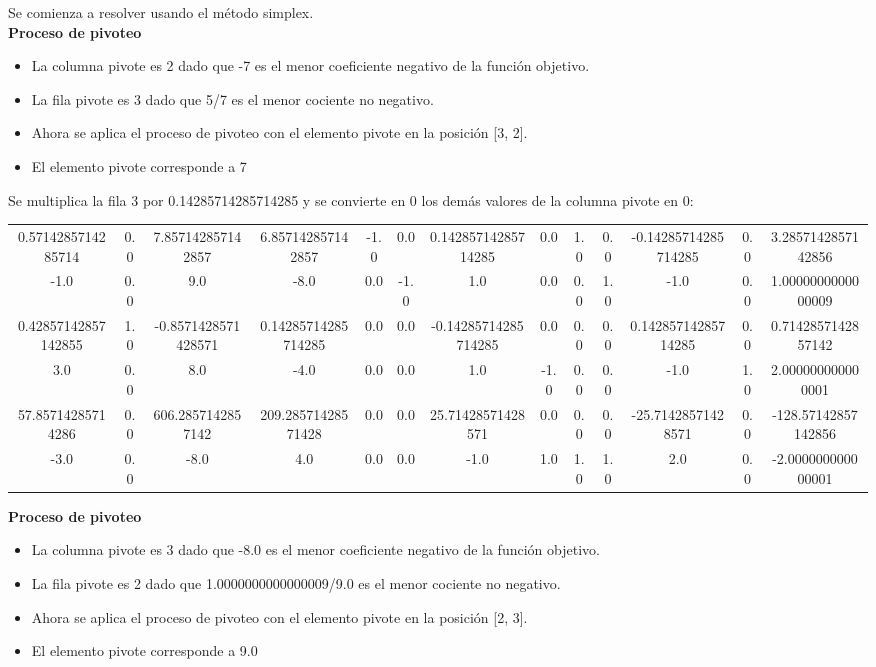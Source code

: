 \documentclass{article} %
\begin{document}
Se comienza a resolver usando el método simplex. \\ 
\textbf{Proceso de pivoteo}
\begin{itemize}
\item La columna pivote es 2 dado que -7  es el menor coeficiente negativo de la función objetivo.
\item La fila pivote es 3 dado que 5/7 es el menor cociente no negativo.
\item Ahora se aplica el proceso de pivoteo con el elemento pivote en la posición [3, 2].
\item El elemento pivote corresponde a 7
\end{itemize}
Se multiplica la fila  3 por 0.14285714285714285  y se convierte en 0 los demás valores de la columna pivote en 0: 
\begin{center}
\begin{tabular}{|cccccccccccc|c|}\hline
0.5714285714285714 & 0.0 & 7.857142857142857 & 6.857142857142857 & -1.0 & 0.0 & 0.14285714285714285 & 0.0 & 1.0 & 0.0 & -0.14285714285714285 & 0.0 & 3.2857142857142856  \\
-1.0 & 0.0 & 9.0 & -8.0 & 0.0 & -1.0 & 1.0 & 0.0 & 0.0 & 1.0 & -1.0 & 0.0 & 1.0000000000000009  \\
0.42857142857142855 & 1.0 & -0.8571428571428571 & 0.14285714285714285 & 0.0 & 0.0 & -0.14285714285714285 & 0.0 & 0.0 & 0.0 & 0.14285714285714285 & 0.0 & 0.7142857142857142  \\
3.0 & 0.0 & 8.0 & -4.0 & 0.0 & 0.0 & 1.0 & -1.0 & 0.0 & 0.0 & -1.0 & 1.0 & 2.000000000000001  \\
\hline
57.85714285714286 & 0.0 & 606.2857142857142 & 209.28571428571428 & 0.0 & 0.0 & 25.71428571428571 & 0.0 & 0.0 & 0.0 & -25.71428571428571 & 0.0 & -128.57142857142856  \\
-3.0 & 0.0 & -8.0 & 4.0 & 0.0 & 0.0 & -1.0 & 1.0 & 1.0 & 1.0 & 2.0 & 0.0 & -2.000000000000001  \\
\hline
\end{tabular}
\end{center}
\textbf{Proceso de pivoteo}
\begin{itemize}
\item La columna pivote es 3 dado que -8.0  es el menor coeficiente negativo de la función objetivo.
\item La fila pivote es 2 dado que 1.0000000000000009/9.0 es el menor cociente no negativo.
\item Ahora se aplica el proceso de pivoteo con el elemento pivote en la posición [2, 3].
\item El elemento pivote corresponde a 9.0
\end{itemize}
\end{document}
